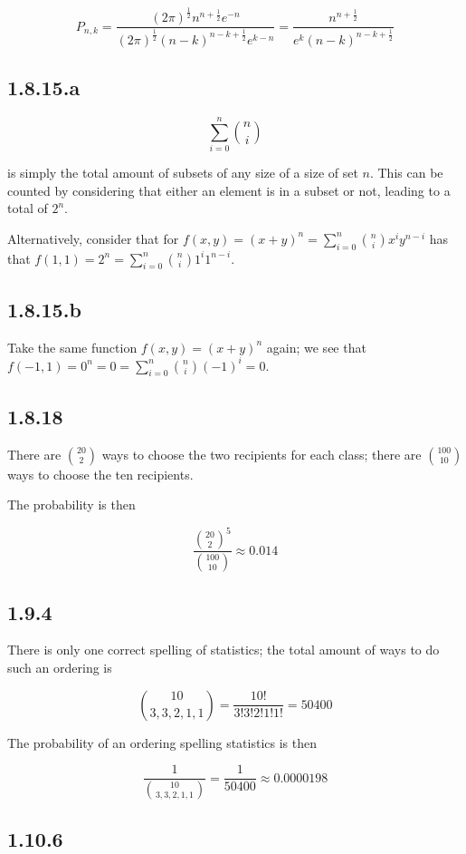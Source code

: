 \documentclass[12pt,letterpaper]{article}
\theoremstyle{definition}
\begin{document}
\[
  P_{n,k} =
  \frac{(2\pi)^{\frac{1}{2}}n^{n+\frac{1}{2}}e^{-n}}{(2\pi)^{\frac{1}{2}}(n-k)^{n-k
      + \frac{1}{2}}e^{k-n}}
  = \frac{n^{n+\frac{1}{2}}}{e^k(n-k)^{n-k+\frac{1}{2}}}
\]

\subsection*{1.8.15.a}

\[
  \sum_{i=0}^n\binom{n}{i}
\]

is simply the total amount of subsets of any size of a size of set $n$. This can
be counted by considering that either an element is in a subset or not, leading
to a total of $2^n$.

Alternatively, consider that for $f(x, y) = (x + y)^n =
\sum_{i=0}^n\binom{n}{i}x^iy^{n-i}$ has that $f(1, 1) = 2^n = \sum_{i=0}^n\binom{n}{i}1^i1^{n-i}$.

\subsection*{1.8.15.b}

Take the same function $f(x, y) = (x + y)^n$ again; we see that $f(-1, 1) = 0^n
= 0 = \sum_{i=0}^n\binom{n}{i}(-1)^i = 0$.

\subsection*{1.8.18}

There are $\binom{20}{2}$ ways to choose the two recipients for each class;
there are $\binom{100}{10}$ ways to choose the ten recipients.

The probability is then

\[
  \frac{\binom{20}{2}^5}{\binom{100}{10}} \approx 0.014
\]

\subsection*{1.9.4}

There is only one correct spelling of statistics; the total amount of ways to do
such an ordering is

\[
  \binom{10}{3,3,2,1,1} = \frac{10!}{3!3!2!1!1!} = 50400
\]

The probability of an ordering spelling statistics is then

\[
  \frac{1}{\binom{10}{3,3,2,1,1}} = \frac{1}{50400} \approx 0.0000198
\]

\subsection*{1.10.6}
\end{document}
